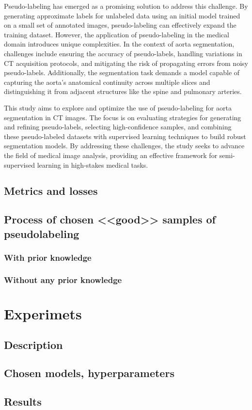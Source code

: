 \documentclass{article}
\begin{document}
Pseudo-labeling has emerged as a promising solution to address this challenge. By generating approximate labels for unlabeled data using an initial model trained on a small set of annotated images, pseudo-labeling can effectively expand the training dataset. However, the application of pseudo-labeling in the medical domain introduces unique complexities. In the context of aorta segmentation, challenges include ensuring the accuracy of pseudo-labels, handling variations in CT acquisition protocols, and mitigating the risk of propagating errors from noisy pseudo-labels. Additionally, the segmentation task demands a model capable of capturing the aorta’s anatomical continuity across multiple slices and distinguishing it from adjacent structures like the spine and pulmonary arteries.

This study aims to explore and optimize the use of pseudo-labeling for aorta segmentation in CT images. The focus is on evaluating strategies for generating and refining pseudo-labels, selecting high-confidence samples, and combining these pseudo-labeled datasets with supervised learning techniques to build robust segmentation models. By addressing these challenges, the study seeks to advance the field of medical image analysis, providing an effective framework for semi-supervised learning in high-stakes medical tasks.

\subsection{Metrics and losses}

\subsection{Process of chosen <<good>> samples of pseudolabeling}

\subsubsection{With prior knowledge}

\subsubsection{Without any prior knowledge}

\section{Experimets}

\subsection{Description}

\subsection{Chosen models, hyperparameters}

\subsection{Results}





\end{document}
